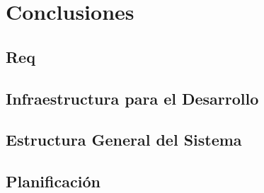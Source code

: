 \chapter{Conclusiones}\label{Chapter5}

\section{Req}

\section{Infraestructura para el Desarrollo}

\section{Estructura General del Sistema}

\section{{Planificación}}
